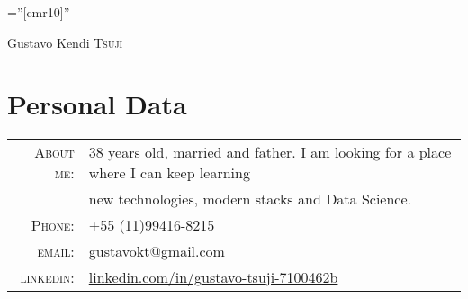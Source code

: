 \documentclass[a4paper,10pt]{article}
\begin{document}

\pagestyle{empty} %

\font\fb=''[cmr10]'' %

\par{\centering
    {\Huge Gustavo Kendi \textsc{Tsuji}
  }\bigskip\par}

\section{Personal Data}

\begin{tabular}{rl}
  \textsc{About me:}   & 38 years old, married and father. I am looking for a place where I can keep learning \\
    &new technologies, modern stacks and Data Science.\\
    \textsc{Phone:}     & +55 (11)99416-8215\\
    \textsc{email:}     & \href{mailto:gustavokt@gmail.com}{gustavokt@gmail.com} \\
    \textsc{linkedin:}     & \href{linkedin.com/in/gustavo-tsuji-7100462b}{linkedin.com/in/gustavo-tsuji-7100462b}
\end{tabular}

\end{document}
